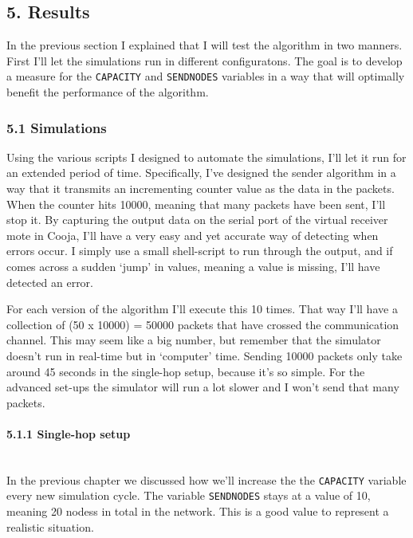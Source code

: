 \subsection{5. Results}\label{results}

In the previous section I explained that I will test the algorithm in
two manners. First I'll let the simulations run in different
configuratons. The goal is to develop a measure for the
\texttt{CAPACITY} and \texttt{SENDNODES} variables in a way that will
optimally benefit the performance of the algorithm.

\subsubsection{5.1 Simulations}\label{simulations}

Using the various scripts I designed to automate the simulations, I'll
let it run for an extended period of time. Specifically, I've designed
the sender algorithm in a way that it transmits an incrementing counter
value as the data in the packets. When the counter hits 10000, meaning
that many packets have been sent, I'll stop it. By capturing the output
data on the serial port of the virtual receiver mote in Cooja, I'll have
a very easy and yet accurate way of detecting when errors occur. I
simply use a small shell-script to run through the output, and if comes
across a sudden `jump' in values, meaning a value is missing, I'll have
detected an error.

For each version of the algorithm I'll execute this 10 times. That way
I'll have a collection of (50 x 10000) = 50000 packets that have crossed
the communication channel. This may seem like a big number, but remember
that the simulator doesn't run in real-time but in `computer' time.
Sending 10000 packets only take around 45 seconds in the single-hop
setup, because it's so simple. For the advanced set-ups the simulator
will run a lot slower and I won't send that many packets.

\paragraph{5.1.1 Single-hop setup\\\\}\label{single-hop-setup}

In the previous chapter we discussed how we'll increase the the
\texttt{CAPACITY} variable every new simulation cycle. The variable
\texttt{SENDNODES} stays at a value of 10, meaning 20 nodess in total in
the network. This is a good value to represent a realistic situation.

